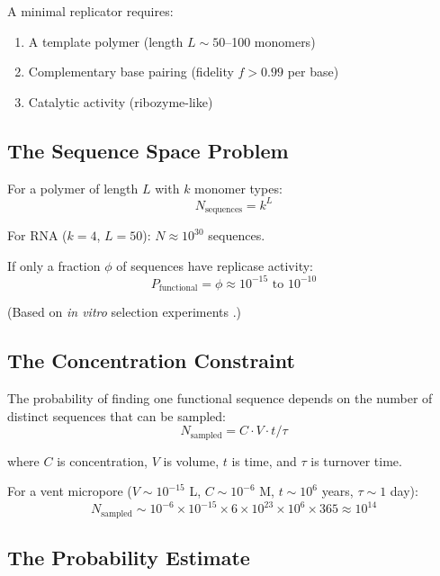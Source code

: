 \documentclass[11pt,twocolumn]{article}
\begin{document}
A minimal replicator requires:
\begin{enumerate}
\item A template polymer (length $L \sim 50$--100 monomers)
\item Complementary base pairing (fidelity $f > 0.99$ per base)
\item Catalytic activity (ribozyme-like)
\end{enumerate}

\subsection{The Sequence Space Problem}

For a polymer of length $L$ with $k$ monomer types:
\begin{equation}
N_{\text{sequences}} = k^L
\end{equation}

For RNA ($k=4$, $L=50$): $N \approx 10^{30}$ sequences.

If only a fraction $\phi$ of sequences have replicase activity:
\begin{equation}
P_{\text{functional}} = \phi \approx 10^{-15} \text{ to } 10^{-10}
\end{equation}

(Based on \textit{in vitro} selection experiments \citep{Joyce2004}.)

\subsection{The Concentration Constraint}

The probability of finding one functional sequence depends on the number of distinct sequences that can be sampled:
\begin{equation}
N_{\text{sampled}} = C \cdot V \cdot t / \tau
\end{equation}

where $C$ is concentration, $V$ is volume, $t$ is time, and $\tau$ is turnover time.

For a vent micropore ($V \sim 10^{-15}$ L, $C \sim 10^{-6}$ M, $t \sim 10^6$ years, $\tau \sim 1$ day):
\begin{equation}
N_{\text{sampled}} \sim 10^{-6} \times 10^{-15} \times 6 \times 10^{23} \times 10^6 \times 365 \approx 10^{14}
\end{equation}

\subsection{The Probability Estimate}
\end{document}
